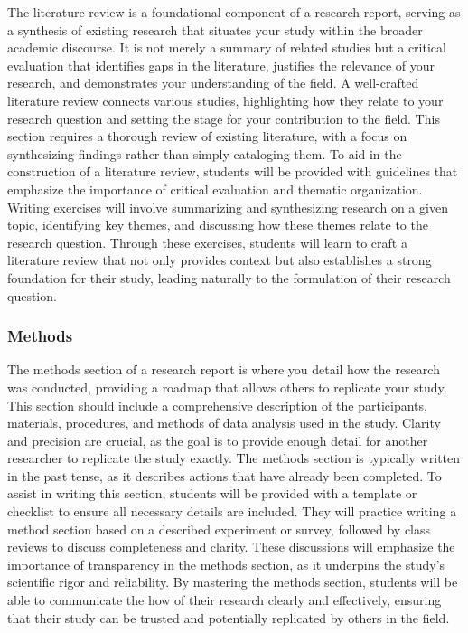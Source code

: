 \documentclass[
]{book}
\begin{document}
The literature review is a foundational component of a research report, serving as a synthesis of existing research that situates your study within the broader academic discourse. It is not merely a summary of related studies but a critical evaluation that identifies gaps in the literature, justifies the relevance of your research, and demonstrates your understanding of the field. A well-crafted literature review connects various studies, highlighting how they relate to your research question and setting the stage for your contribution to the field. This section requires a thorough review of existing literature, with a focus on synthesizing findings rather than simply cataloging them. To aid in the construction of a literature review, students will be provided with guidelines that emphasize the importance of critical evaluation and thematic organization. Writing exercises will involve summarizing and synthesizing research on a given topic, identifying key themes, and discussing how these themes relate to the research question. Through these exercises, students will learn to craft a literature review that not only provides context but also establishes a strong foundation for their study, leading naturally to the formulation of their research question.

\subsubsection*{Methods}\label{methods}

The methods section of a research report is where you detail how the research was conducted, providing a roadmap that allows others to replicate your study. This section should include a comprehensive description of the participants, materials, procedures, and methods of data analysis used in the study. Clarity and precision are crucial, as the goal is to provide enough detail for another researcher to replicate the study exactly. The methods section is typically written in the past tense, as it describes actions that have already been completed. To assist in writing this section, students will be provided with a template or checklist to ensure all necessary details are included. They will practice writing a method section based on a described experiment or survey, followed by class reviews to discuss completeness and clarity. These discussions will emphasize the importance of transparency in the methods section, as it underpins the study's scientific rigor and reliability. By mastering the methods section, students will be able to communicate the how of their research clearly and effectively, ensuring that their study can be trusted and potentially replicated by others in the field.
\end{document}
